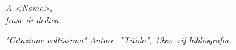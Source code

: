 \thispagestyle{empty}
\begin{flushright}
\textit{A <Nome>, \\
frase di dedica.}
\end{flushright}

\bigskip

\thispagestyle{empty}
\begin{flushright}
\textit{"Citazione coltissima"} \textit{Autore, "Titolo", 19xx, rif bibliografia.}
\end{flushright}
